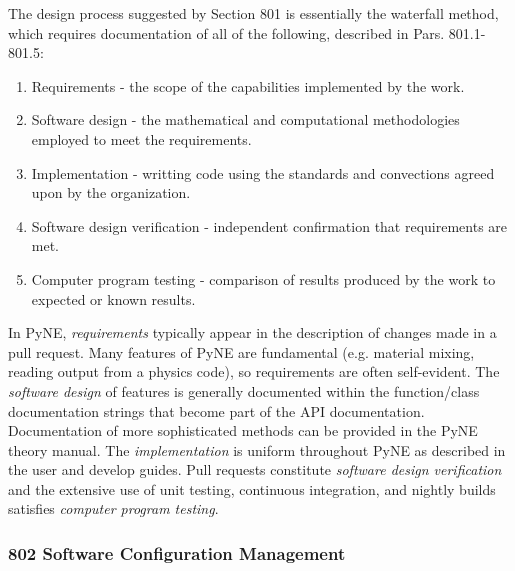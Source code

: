 \documentclass{anstrans}
\begin{document}
The design process suggested by Section 801 is essentially the waterfall method, which requires documentation of all of the following, described in Pars. 801.1-801.5:

\begin{enumerate} 
\item{Requirements - the scope of the capabilities implemented by the work.}
\item{Software design - the mathematical and computational methodologies employed to meet the requirements.}
\item{Implementation - writting code using the standards and convections agreed upon by the organization.}
\item{Software design verification - independent confirmation that requirements are met.}
\item{Computer program testing - comparison of results produced by the work to expected or known results.}
\end{enumerate}

In PyNE, \emph{requirements} typically appear in the description of changes made in
a pull request. Many features of PyNE are fundamental (e.g. material mixing, reading output from a physics code), so requirements are often self-evident. 
The \emph{software design} of features is generally documented
within the function/class documentation strings that become part of the API
documentation. Documentation of more sophisticated methods can be provided in the PyNE
theory manual. The \emph{implementation} is uniform throughout PyNE as described
in the user and develop guides. Pull requests constitute \emph{software design
verification} and the extensive use of unit testing, continuous integration, and nightly builds
satisfies \emph{computer program testing}.

\subsubsection{802 Software Configuration Management}
\end{document}
